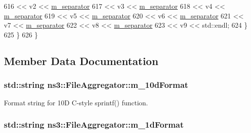 \begin{DoxyCode}
616                  << v2 << \hyperlink{classns3_1_1FileAggregator_a1f74a4c07f663d535da56dfb70414a15}{m\_separator}
617                  << v3 << \hyperlink{classns3_1_1FileAggregator_a1f74a4c07f663d535da56dfb70414a15}{m\_separator}
618                  << v4 << \hyperlink{classns3_1_1FileAggregator_a1f74a4c07f663d535da56dfb70414a15}{m\_separator}
619                  << v5 << \hyperlink{classns3_1_1FileAggregator_a1f74a4c07f663d535da56dfb70414a15}{m\_separator}
620                  << v6 << \hyperlink{classns3_1_1FileAggregator_a1f74a4c07f663d535da56dfb70414a15}{m\_separator}
621                  << v7 << \hyperlink{classns3_1_1FileAggregator_a1f74a4c07f663d535da56dfb70414a15}{m\_separator}
622                  << v8 << \hyperlink{classns3_1_1FileAggregator_a1f74a4c07f663d535da56dfb70414a15}{m\_separator}
623                  << v9 << std::endl;
624         \}
625     \}
626 \}
\end{DoxyCode}


\subsection{Member Data Documentation}
\subsubsection[{\texorpdfstring{m\+\_\+10d\+Format}{m_10dFormat}}]{\setlength{\rightskip}{0pt plus 5cm}std\+::string ns3\+::\+File\+Aggregator\+::m\+\_\+10d\+Format\hspace{0.3cm}{\ttfamily [private]}}\hypertarget{classns3_1_1FileAggregator_a737006d5ab018c7f7d3b00bf85040015}{}\label{classns3_1_1FileAggregator_a737006d5ab018c7f7d3b00bf85040015}


Format string for 10D C-\/style sprintf() function. 

\subsubsection[{\texorpdfstring{m\+\_\+1d\+Format}{m_1dFormat}}]{\setlength{\rightskip}{0pt plus 5cm}std\+::string ns3\+::\+File\+Aggregator\+::m\+\_\+1d\+Format\hspace{0.3cm}{\ttfamily [private]}}\hypertarget{classns3_1_1FileAggregator_ac0d6eb5be1e146ebba86897303191c88}{}\label{classns3_1_1FileAggregator_ac0d6eb5be1e146ebba86897303191c88}


